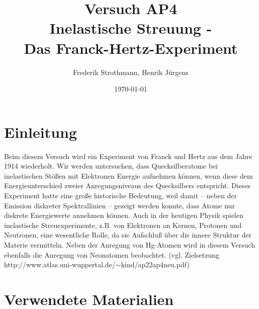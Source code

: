 \documentclass[12pt,a4paper]{article}
\title{Versuch AP4\\ Inelastische Streuung -\\ Das Franck-Hertz-Experiment}
\author{Frederik Strothmann, Henrik Jürgens}
\date{\today}
\begin{document}
\maketitle
\newpage
\tableofcontents
\newpage
\section{Einleitung}
Beim diesem Versuch wird ein Experiment von Franck und Hertz aus dem Jahre 1914 wiederholt. Wir werden untersuchen, dass Quecksilberatome bei inelastischen Stößen mit Elektronen Energie aufnehmen können, wenn diese dem Energieunterschied zweier Anregungsniveaus des Quecksilbers entspricht. Dieses Experiment hatte eine große historische Bedeutung, weil damit -- neben der Emission diskreter Spektrallinien -- gezeigt werden konnte, dass Atome nur diskrete Energiewerte annehmen können. Auch in der heutigen Physik spielen inelastische Streuexperimente, z.B. von Elektronen an Kernen, Protonen und Neutronen, eine wesentliche Rolle, da sie Aufschluß über die innere Struktur der Materie vermitteln. Neben der Anregung von Hg-Atomen wird in diesem Versuch ebenfalls die Anregung von Neonatomen beobachtet. (vgl. Zielsetzung http://www.atlas.uni-wuppertal.de/$\sim$kind/ap22ap4neu.pdf)
\section{Verwendete Materialien}
\end{document}

